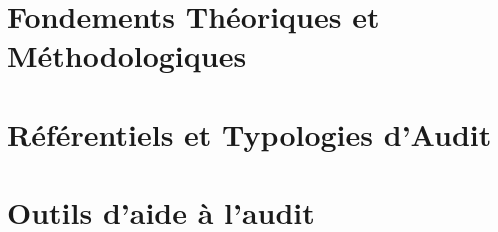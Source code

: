 \documentclass[12pt, a4paper, twoside, openany]{book}
\begin{document}
\mainmatter



\part{Fondements Théoriques et Méthodologiques}







\part{Référentiels et Typologies d'Audit}





\part{Outils d'aide à l'audit}





\end{document}
